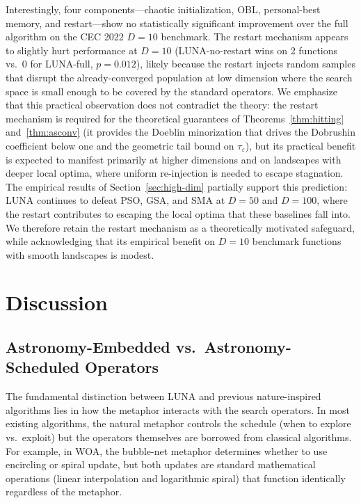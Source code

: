 \documentclass[review]{elsarticle}
\theoremstyle{definition}
\begin{document}
Interestingly, four components---chaotic initialization, OBL, personal-best memory, and restart---show no statistically significant improvement over the full algorithm on the CEC 2022 $D=10$ benchmark. The restart mechanism appears to slightly hurt performance at $D=10$ (LUNA-no-restart wins on 2 functions vs.\ 0 for LUNA-full, $p = 0.012$), likely because the restart injects random samples that disrupt the already-converged population at low dimension where the search space is small enough to be covered by the standard operators. We emphasize that this practical observation does not contradict the theory: the restart mechanism is required for the theoretical guarantees of Theorems~\ref{thm:hitting} and~\ref{thm:asconv} (it provides the Doeblin minorization that drives the Dobrushin coefficient below one and the geometric tail bound on $\tau_\varepsilon$), but its practical benefit is expected to manifest primarily at higher dimensions and on landscapes with deeper local optima, where uniform re-injection is needed to escape stagnation. The empirical results of Section~\ref{sec:high-dim} partially support this prediction: LUNA continues to defeat PSO, GSA, and SMA at $D=50$ and $D=100$, where the restart contributes to escaping the local optima that these baselines fall into. We therefore retain the restart mechanism as a theoretically motivated safeguard, while acknowledging that its empirical benefit on $D=10$ benchmark functions with smooth landscapes is modest.


\section{Discussion}
\label{sec:discussion}

\subsection{Astronomy-Embedded vs.\ Astronomy-Scheduled Operators}

The fundamental distinction between LUNA and previous nature-inspired algorithms lies in how the metaphor interacts with the search operators. In most existing algorithms, the natural metaphor controls the schedule (when to explore vs.\ exploit) but the operators themselves are borrowed from classical algorithms. For example, in WOA, the bubble-net metaphor determines whether to use encircling or spiral update, but both updates are standard mathematical operations (linear interpolation and logarithmic spiral) that function identically regardless of the metaphor.
\end{document}
